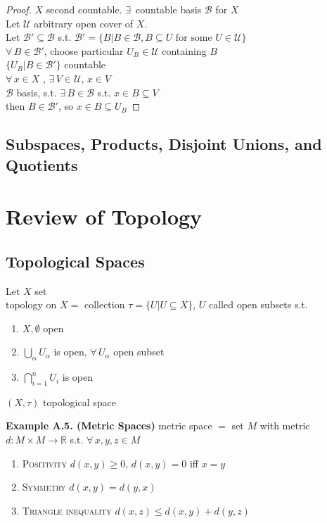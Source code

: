 \begin{proof}
  $X$ second countable. $\exists \, $ countable basis $\mathcal{B}$ for $X$ \\
Let $\mathcal{U}$ arbitrary open cover of $X$. \\
Let $\mathcal{B}' \subseteq \mathcal{B}$ s.t. $\mathcal{B}' = \lbrace  B | B \in \mathcal{B}, B\subseteq U \text{ for some } U \in \mathcal{U} \rbrace$ \\

$\forall \, B \in \mathcal{B}'$, choose particular $U_B \in \mathcal{U}$ containing $B$ \\

$\lbrace U_B | B \in \mathcal{B}'\rbrace$ countable \\

$\forall \, x \in X$ , $\exists \, V \in \mathcal{U}$, $x\in V$ \\
$\mathcal{B} $ basis, s.t. $\exists \, B \in \mathcal{B}$ s.t. $x\in B \subseteq V$ \\
then $B \in \mathcal{B}'$, so $x\in B \subseteq U_B$
\end{proof} 

\subsection*{Subspaces, Products, Disjoint Unions, and Quotients }


\section*{Review of Topology}

\subsection*{Topological Spaces}

Let $X$ set \\
topology on $X = $ collection $\tau = \lbrace U | U \subseteq X \rbrace$, $U$ called open subsets s.t.
\begin{enumerate}
\item[(i)] $X, \emptyset$ open 
\item[(ii)] $\bigcup_{\alpha} U_{\alpha}$ is open, $\forall \, U_{\alpha}$ open subset
\item[(iii)] $\bigcap_{i=1}^n U_i$ is open
\end{enumerate}

$(X,\tau)$ topological space


\textbf{Example A.5. (Metric Spaces)}
metric space $=$ set $M$ with metric $d: M \times M \to \mathbb{R}$ s.t. $\forall \, x, y, z \in M$
\begin{enumerate}
\item[(i)] \textsc{Positivity} $d(x,y) \geq 0$, $d(x,y) =0$ iff $x=y$ 
\item[(ii)] \textsc{Symmetry} $d(x,y) =d(y,x)$
\item[(iii)] \textsc{Triangle inequality} $d(x,z) \leq d(x,y) + d(y,z)$
\end{enumerate}

